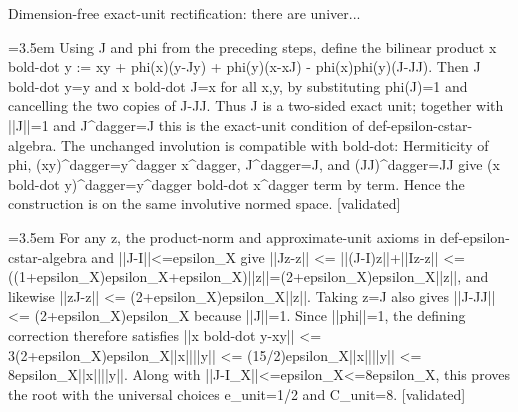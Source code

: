 \documentclass{article}
\newcommand{\step}[1]{\par\noindent\hangindent=3.5em\hangafter=1%
  \makebox[3.5em][l]{\textbf{#1.}}}
\newcommand{\steptag}[1]{\hfill{\small\textsf{[#1]}}}
\begin{document}
\begin{proofbox}{Dimension-free exact-unit rectification: there are univer...}
\step{1.3} Using J and phi from the preceding steps, define the bilinear product x bold-dot y := xy + phi(x)(y-Jy) + phi(y)(x-xJ) - phi(x)phi(y)(J-JJ). Then J bold-dot y=y and x bold-dot J=x for all x,y, by substituting phi(J)=1 and cancelling the two copies of J-JJ. Thus J is a two-sided exact unit; together with ||J||=1 and J\textasciicircum{}dagger=J this is the exact-unit condition of def-epsilon-cstar-algebra. The unchanged involution is compatible with bold-dot: Hermiticity of phi, (xy)\textasciicircum{}dagger=y\textasciicircum{}dagger x\textasciicircum{}dagger, J\textasciicircum{}dagger=J, and (JJ)\textasciicircum{}dagger=JJ give (x bold-dot y)\textasciicircum{}dagger=y\textasciicircum{}dagger bold-dot x\textasciicircum{}dagger term by term. Hence the construction is on the same involutive normed space. \steptag{validated} \\[4pt]
\step{1.4} For any z, the product-norm and approximate-unit axioms in def-epsilon-cstar-algebra and ||J-I||<=epsilon\_X give ||Jz-z|| <= ||(J-I)z||+||Iz-z|| <= ((1+epsilon\_X)epsilon\_X+epsilon\_X)||z||=(2+epsilon\_X)epsilon\_X||z||, and likewise ||zJ-z|| <= (2+epsilon\_X)epsilon\_X||z||. Taking z=J also gives ||J-JJ|| <= (2+epsilon\_X)epsilon\_X because ||J||=1. Since ||phi||=1, the defining correction therefore satisfies ||x bold-dot y-xy|| <= 3(2+epsilon\_X)epsilon\_X||x||||y|| <= (15/2)epsilon\_X||x||||y|| <= 8epsilon\_X||x||||y||. Along with ||J-I\_X||<=epsilon\_X<=8epsilon\_X, this proves the root with the universal choices e\_unit=1/2 and C\_unit=8. \steptag{validated} \\[4pt]
\end{proofbox}
\end{document}
